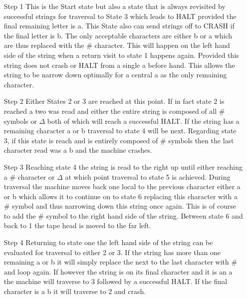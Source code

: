 \documentclass[10pt]{report}
\begin{document}
\begin{enumerate}
\item[Step 1] This is the Start state but also a state that is always revisited by successful strings for traversal to State 3 which leads to HALT provided the final remaining letter is a. This State also can send strings off to CRASH if the final letter is b. The only acceptable characters are either b or a which are thus replaced with the \# character. This will happen on the left hand side of the string when a return visit to state 1 happens again. Provided this string does not crash or HALT from a single a before hand. This allows the string to be narrow down optimally for a central a as the only remaining character.
\item [Step 2] Either States 2 or 3 are reached at this point. If in fact state 2 is reached a two was read and either the entire string is composed of all \# symbols or $\Delta$ both of which will reach a successful HALT. If the string has a remaining character a or b traversal to state 4 will be next. Regarding state 3, if this state is reach and is entirely composed of \# symbols then the last character read was a b and the machine crashes. 
\item[Step 3] Reaching state 4 the string is read to the right up until either reaching a \# character or $\Delta$ at which point traversal to state 5 is achieved. During traversal the machine moves back one local to the previous character either a or b which allows it to continue on to state 6  replacing this character with a \# symbol and thus narrowing down this string once again. This is of course to add the \# symbol to the right hand side of the string. Between state 6 and back to 1 the tape head is moved to the far left.
\item[Step 4] 
Returning to state one the left hand side of the string can be evaluated for traversal to either 2 or 3. If the string has more than one remaining a or b it will simply replace the next to the last character with \# and loop again. If however the string is on its final character and it is an a the machine will traverse to 3 followed by a successful HALT. If the final character is a b it will traverse to 2 and crash.
\end{enumerate}
\clearpage
\end{document}
